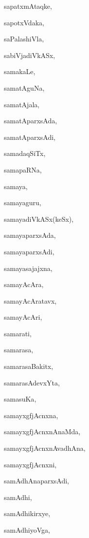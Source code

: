 \begin{multicols}{2}
{sapatxmAtaqke}, \pageref{sapatxmAtaqke2}

{sapotxVdaka}, \pageref{sapotxVdaka}

{saPalashiVla}, \pageref{saPalashiVla}

{sabiVjadiVkASx}, \pageref{sabiVjadiVkASx}

{samakaLe}, \pageref{samakaLe}

{samatAguNa}, \pageref{samatAguNa}

{samatAjala}, \pageref{samatAjala}

{samatAparxsAda}, \pageref{samatAparxsAda}

{samatAparxsAdi}, \pageref{samatAparxsAdi}

{samadaqSiTx}, \pageref{samadaqSiTx}

{samapaRNa}, \pageref{samapaRNa}

{samaya}, \pageref{samaya}

{samayaguru}, \pageref{samayaguru}

{samayadiVkASx(keSx)}, \pageref{samayadiVkASxkeSx}

{samayaparxsAda}, \pageref{samayaparxsAda}

{samayaparxsAdi}, \pageref{samayaparxsAdi}

{samayasajajxna}, \pageref{samayasajajxna}

{samayAcAra}, \pageref{samayAcAra}

{samayAcAratavx}, \pageref{samayAcAratavx}

{samayAcAri}, \pageref{samayAcAri}

{samarati}, \pageref{samarati}

{samarasa}, \pageref{samarasa}

{samarasaBakitx}, \pageref{samarasaBakitx}

{samarasAdevxYta}, \pageref{samarasAdevxYta}

{samasuKa}, \pageref{samasuKa}

{samayxgfjAcnxna}, \pageref{samayxgfjAcnxna}

{samayxgfjAcnxnAnaMda}, \pageref{samayxgfjAcnxnAnaMda}

{samayxgfjAcnxnAvadhAna}, \pageref{samayxgfjAcnxnAvadhAna}

{samayxgfjAcnxni}, \pageref{samayxgfjAcnxni}

{samAdhAnaparxsAdi}, \pageref{samAdhAnaparxsAdi}

{samAdhi}, \pageref{samAdhi}

{samAdhikirxye}, \pageref{samAdhikirxye}

{samAdhiyoVga}, \pageref{samAdhiyoVga}


\end{multicols}
